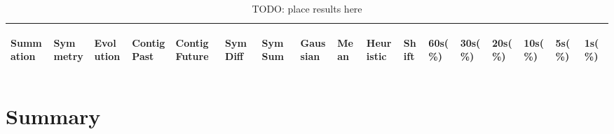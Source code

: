 \documentclass[twocolumn]{article}
\begin{document}
\begin{table}[t]
\centering
	\begin{tabular}{|llllllll|lll|llllll|}
		\hline 
	
			\begin{sideways}Summation\end{sideways}&\begin{sideways}Symmetry\end{sideways} &\begin{sideways}Evolution\end{sideways}&\begin{sideways}Contig Past\end{sideways} &\begin{sideways}Contig Future\end{sideways}&\begin{sideways}Sym Diff\end{sideways}&\begin{sideways}Sym Sum\end{sideways} &\begin{sideways}Gaussian\end{sideways} &  \begin{sideways}Mean\end{sideways} & \begin{sideways}Heuristic\end{sideways} & \begin{sideways}Shift\end{sideways} & \begin{sideways}60s(\%)\end{sideways} & \begin{sideways}30s(\%)\end{sideways} & \begin{sideways}20s(\%)\end{sideways} & \begin{sideways}10s(\%)\end{sideways} & \begin{sideways}5s(\%)\end{sideways} & \begin{sideways}1s(\%)\end{sideways}    \\ \hline 
			
	


	\hline 
	\end{tabular}
\caption{TODO: place results here}
\end{table}


\section{Summary}\label{conclusions}
\end{document}
